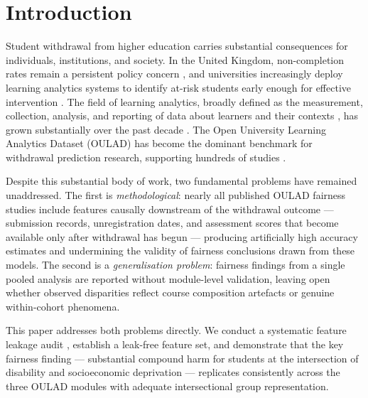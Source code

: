 \documentclass[12pt,a4paper]{article}
\begin{document}
\newpage
\setcounter{page}{1}

\section{Introduction}

Student withdrawal from higher education carries substantial consequences for
individuals, institutions, and society. In the United Kingdom, non-completion
rates remain a persistent policy concern \citep{equalityact2010, viberg2018},
and universities increasingly deploy learning analytics systems to identify
at-risk students early enough for effective intervention \citep{kuzilek2017,
slade2013}. The field of learning analytics, broadly defined as the
measurement, collection, analysis, and reporting of data about learners and
their contexts \citep{siemens2013}, has grown substantially over the past
decade \citep{ferguson2012, romero2010}. The Open University Learning
Analytics Dataset (OULAD) has become the dominant benchmark for withdrawal
prediction research, supporting hundreds of studies \citep{kuzilek2017,
bakhshinategh2018, opoku2025}.

Despite this substantial body of work, two fundamental problems have remained
unaddressed. The first is \textit{methodological}: nearly all published OULAD
fairness studies include features causally downstream of the withdrawal
outcome --- submission records, unregistration dates, and assessment scores
that become available only after withdrawal has begun --- producing
artificially high accuracy estimates and undermining the validity of fairness
conclusions drawn from these models. The second is a
\textit{generalisation problem}: fairness findings from a single pooled
analysis are reported without module-level validation, leaving open whether
observed disparities reflect course composition artefacts or genuine
within-cohort phenomena.

This paper addresses both problems directly. We conduct a systematic feature
leakage audit \citep{kaufman2012}, establish a leak-free feature set, and
demonstrate that the key fairness finding --- substantial compound harm for
students at the intersection of disability and socioeconomic deprivation ---
replicates consistently across the three OULAD modules with adequate
intersectional group representation.
\end{document}
